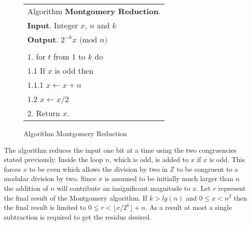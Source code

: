 \documentclass[b5paper]{book}
\def\Z{{\mathbb Z}}
\begin{document}
\newpage\begin{figure}[!here]
\begin{small}
\begin{center}
\begin{tabular}{l}
\hline Algorithm \textbf{Montgomery Reduction}. \\
\textbf{Input}.   Integer $x$, $n$ and $k$ \\
\textbf{Output}.  $2^{-k}x \mbox{ (mod }n\mbox{)}$ \\
\hline \\
1.  for $t$ from $1$ to $k$ do \\
\hspace{3mm}1.1  If $x$ is odd then \\
\hspace{6mm}1.1.1  $x \leftarrow x + n$ \\
\hspace{3mm}1.2  $x \leftarrow x/2$ \\
2.  Return $x$. \\
\hline
\end{tabular}
\end{center}
\end{small}
\caption{Algorithm Montgomery Reduction}
\end{figure}

The algorithm reduces the input one bit at a time using the two congruencies stated previously.  Inside the loop $n$, which is odd, is
added to $x$ if $x$ is odd.  This forces $x$ to be even which allows the division by two in $\Z$ to be congruent to a modular division by two.  Since
$x$ is assumed to be initially much larger than $n$ the addition of $n$ will contribute an insignificant magnitude to $x$.  Let $r$ represent the 
final result of the Montgomery algorithm.  If $k > lg(n)$ and $0 \le x < n^2$ then the final result is limited to 
$0 \le r < \lfloor x/2^k \rfloor + n$.  As a result at most a single subtraction is required to get the residue desired.
\end{document}
